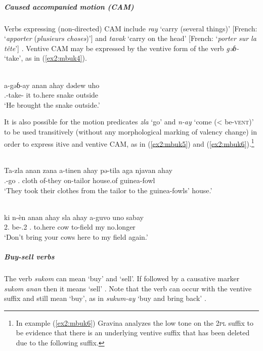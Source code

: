 \subparagraph{Caused accompanied motion (CAM)}

Verbs expressing (non-directed) CAM include \textit{ray} `carry (several things)' [French: `\textit{apporter} (\textit{plusieurs choses})'] and \textit{tavak} `carry on the head' [French: `\textit{porter sur la tête}'] \citep{gravinaMbukoLexicon2003,webonaryDictionnaireMbuko2016}. Ventive CAM may be expressed by the ventive form of the verb \textit{gəɓ-} `take', as in (\ref{ex2:mbuk4}).

\ea\label{ex2:mbuk4}
 \\
\gll  a-gəɓ-ay anan ahay dədew uho	\\
.-take- it to.here snake outside	\\
\glt `He brought the snake outside.'
\z 

It is also possible for the motion predicates \textit{zla} `go' and \textit{n-ay} `come (< be-\textsc{vent})' to be used transitively (without any morphological marking of valency change) in order to express itive and ventive CAM, as in (\ref{ex2:mbuk5}) and (\ref{ex2:mbuk6}).\footnote{In example (\ref{ex2:mbuk6}) Gravina analyzes the low tone on the 2\textsc{pl} suffix to be evidence that there is an underlying ventive suffix that has been deleted due to the following suffix.}

\ea\label{ex2:mbuk5}
 \\
\gll Ta-zla anan zana a-tinen ahay pə-tila aga njavan ahay\\
.-go . cloth of-they  on-tailor house.of guinea-fowl \\
\glt `They took their clothes from the tailor to the guinea-fowls’ house.'

\ex\label{ex2:mbuk6}
 \\
\gll ki n-èn anan ahay sla ahay a-guvo uno sabay \\
2. be-.2 . to.here cow  to-field my no.longer	\\
\glt `Don’t bring your cows here to my field again.'
\z 

\subparagraph{Buy-sell verbs}

The verb \textit{sukom} can mean `buy' and `sell'. If followed by a causative marker \textit{sukom anan} then it means `sell' \citep{gravinaMbukoLexicon2003,webonaryDictionnaireMbuko2016}. Note that the verb can occur with the ventive suffix and still mean `buy', as in \textit{sukum-ay} `buy and bring back' \citep[8]{gravinaVerbPhraseMbuko2001}.

